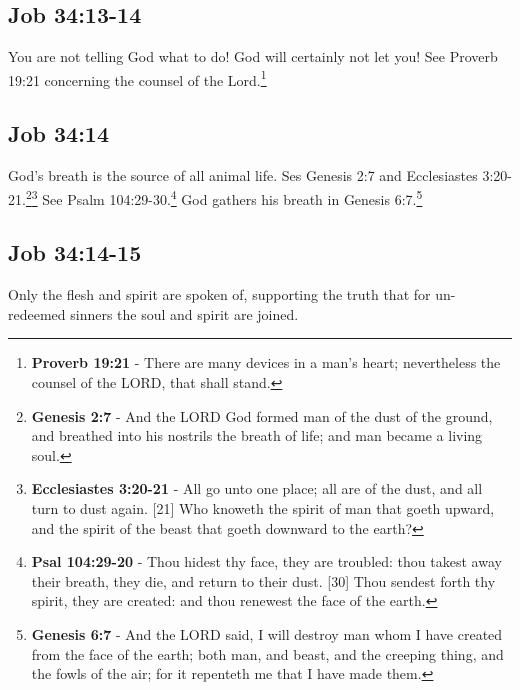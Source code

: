 \subsection{Job 34:13-14}
You are not telling God what to do! God will certainly not let you! See Proverb 19:21 concerning the counsel of the Lord.\footnote{\textbf{Proverb 19:21} - There are many devices in a man’s heart; nevertheless the counsel of the LORD, that shall stand.}\cite{thomas_20220309}

\subsection{Job 34:14}
God's breath is the source of all animal life. Ses Genesis 2:7 and Ecclesiastes 3:20-21.\footnote{\textbf{Genesis 2:7} - And the LORD God formed man of the dust of the ground, and breathed into his nostrils the breath of life; and man became a living soul.}\footnote{\textbf{Ecclesiastes 3:20-21} - All go unto one place; all are of the dust, and all turn to dust again. [21] Who knoweth the spirit of man that goeth upward, and the spirit of the beast that goeth downward to the earth?} See Psalm 104:29-30.\footnote{\textbf{Psal 104:29-20} - Thou hidest thy face, they are troubled: thou takest away their breath, they die, and return to their dust. [30] Thou sendest forth thy spirit, they are created: and thou renewest the face of the earth.} God gathers his breath in Genesis 6:7.\footnote{\textbf{Genesis 6:7} - And the LORD said, I will destroy man whom I have created from the face of the earth; both man, and beast, and the creeping thing, and the fowls of the air; for it repenteth me that I have made them.}

\subsection{Job 34:14-15}
Only the flesh and spirit are spoken of, supporting the truth that for un-redeemed sinners the soul and spirit are joined.\cite{thomas_20220309}